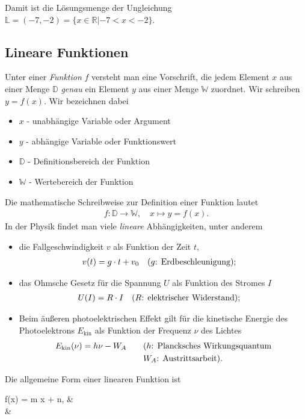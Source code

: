 Damit ist die Lösungsmenge der Ungleichung $\mathbb{L} = (-7,-2) = \{x\in \mathbb{R}|-7 < x<-2\}$.

\subsection{Lineare Funktionen} 

Unter einer \emph{Funktion} $f$ versteht man eine Vorschrift, die jedem Element $x$ aus einer Menge $\mathbb{D}$ \emph{genau} ein Element $y$ aus einer Menge $\mathbb{W}$ zuordnet. Wir schreiben $y = f(x)$. Wir bezeichnen dabei 
\begin{itemize}
    \item $x$ - unabhängige Variable oder Argument 
    \item $y$ - abhängige Variable oder Funktionswert 
    \item $\mathbb{D}$ - Definitionsbereich der Funktion 
    \item $\mathbb{W}$ - Wertebereich der Funktion
\end{itemize}
Die mathematische Schreibweise zur Definition einer Funktion lautet 
\begin{align}
        f: \mathbb{D} \to \mathbb{W}, \quad x \mapsto y = f(x).
\end{align}
In der Physik findet man viele \emph{lineare} Abhängigkeiten, unter anderem 
\begin{itemize}
    \item die Fallgeschwindigkeit $v$ als Funktion der Zeit $t$,
    \begin{align}
            v(t) = g \cdot t + v_0 \qq{($g$: Erdbeschleunigung);}
    \end{align}
    \item das Ohmsche Gesetz für die Spannung $U$ als Funktion des Stromes $I$ 
    \begin{align}
            U(I) = R\cdot I \qq{($R$: elektrischer Widerstand);} 
    \end{align}
    \item Beim äußeren photoelektrischen Effekt gilt für die kinetische Energie des Photoelektrons $E_\text{kin}$ als Funktion der Frequenz $\nu$ des Lichtes 
    \begin{align}
            E_\text{kin}(\nu) = h \nu - W_A \qquad &\text{($h$: Plancksches Wirkungsquantum} \\
            &\text{$W_A$: Austrittsarbeit).} \notag
    \end{align}
\end{itemize}
Die allgemeine Form einer linearen Funktion ist 
\begin{mymathbox}[ams align, title={lineare Funktion}, colframe={FSUblau}] \label{eqn:2_lineare_Funktion_Normalform}
    f(x) = m x + n,  \qquad & \\
    & \notag
\end{mymathbox}

